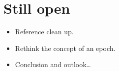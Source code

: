 \documentclass[
reprint,
amsmath,amssymb,amsfonts,clevref,
aps,
prstab,
]{revtex4-2}
\begin{document}
\section{Still open}
	\begin{itemize}
	\item Reference clean up.
	\item Rethink the concept of an epoch.
	\item Conclusion and outlook\dots
\end{itemize}
	
\end{document}
